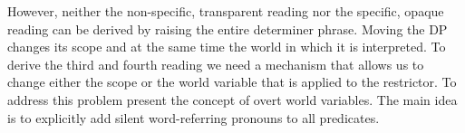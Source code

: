 \documentclass[parskip=half]{scrartcl}
\begin{document}

%
%


However, neither the non-specific, transparent reading nor the specific, opaque reading can be derived by raising the entire determiner phrase. Moving the DP changes its scope
and  at the same time the world in which it is interpreted. To derive the third and fourth reading we need a mechanism that allows us to change either the scope or the  world  
variable that is applied to the restrictor.  To address this problem \cite{Fintel2002} present the concept of overt world variables.  The main idea is to explicitly add silent word-referring pronouns to all predicates.
 
\end{document}
